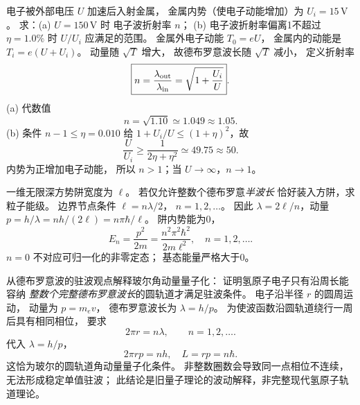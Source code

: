 电子被外部电压 $U$ 加速后入射金属，
金属内势（使电子动能增加）为
$U_i=15\,\mathrm V$。
求：(a) $U=150\,\mathrm V$ 时
电子波折射率 $n$；
(b) 电子波折射率偏离1不超过
$\eta=1.0\%$ 时 $U/U_i$ 应满足的范围。
\exsolution
金属外电子动能 $T_0=eU$，
金属内的动能是 $T_i=e(U+U_i)$。
动量随 $\sqrt T$ 增大，
故德布罗意波长随 $\sqrt T$ 减小，
定义折射率
\[
 \boxed{n=\frac{\lambda_{\rm out}}{\lambda_{\rm in}}
 =\sqrt{1+\frac{U_i}{U}}}.
\]
(a) 代数值
\[
 \boxed{n=\sqrt{1.10}\simeq1.049\approx1.05}.
\]
(b) 条件 $n-1\le\eta=0.010$ 给
$1+U_i/U\le(1+\eta)^2$，故
\[
 \boxed{\frac U{U_i}\ge
 \frac1{2\eta+\eta^2}\simeq49.75\approx50}.
\]
\excheck 内势为正增加电子动能，
所以 $n>1$；当 $U\to\infty$，$n\to1$。

一维无限深方势阱宽度为 $\ell$。
若仅允许整数个德布罗意\emph{半波长}
恰好装入方阱，求粒子能级。
\exsolution
边界节点条件
$\ell=n\lambda/2$，
$n=1,2,\dots$。
因此
$\lambda=2\ell/n$，动量
$p=h/\lambda=nh/(2\ell)=n\pi\hbar/\ell$。
阱内势能为0，
\[
 \boxed{E_n=\frac{p^2}{2m}
 =\frac{n^2\pi^2\hbar^2}{2m\ell^2}},
 \quad n=1,2,\dots.
\]
\excheck $n=0$ 不对应可归一化的非零定态；
基态能量严格大于0。

从德布罗意波的驻波观点解释玻尔角动量量子化：
证明氢原子电子只有沿周长能容纳
\emph{整数个完整德布罗意波长}的圆轨道才满足驻波条件。
\exsolution
电子沿半径 $r$ 的圆周运动，
动量为 $p=m_ev$，
德布罗意波长为
$\lambda=h/p$。
为使波函数沿圆轨道绕行一周后具有相同相位，
要求
\[
 2\pi r=n\lambda,\qquad n=1,2,\dots.
\]
代入 $\lambda=h/p$，
\[
 2\pi rp=nh,\quad
 \boxed{L=rp=n\hbar}.
\]
这恰为玻尔的圆轨道角动量量子化条件。
\excheck 非整数圈数会导致同一点相位不连续，
无法形成稳定单值驻波；
此结论是旧量子理论的波动解释，非完整现代氢原子轨道理论。
